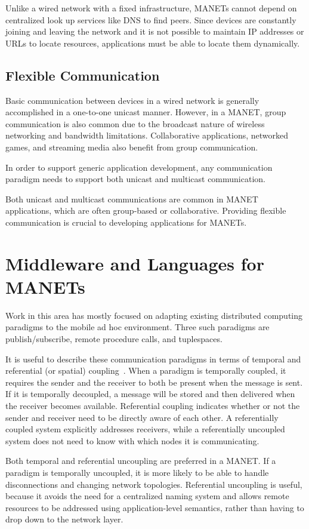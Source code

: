 Unlike a wired network with a fixed infrastructure, MANETs cannot depend on centralized look up services like DNS to find peers. Since devices are constantly joining and leaving the network and it is not possible to maintain IP addresses or URLs to locate resources, applications must be able to locate them dynamically.

\subsection{Flexible Communication}

Basic communication between devices in a wired network is generally accomplished in a one-to-one unicast manner. However, in a MANET, group communication is also common due to the broadcast nature of wireless networking and bandwidth limitations. Collaborative applications, networked games, and streaming media also benefit from group communication.

In order to support generic application development, any communication paradigm needs to support both unicast and multicast communication.

 Both unicast and multicast communications are common in MANET applications, which are often group-based or collaborative. Providing flexible communication is crucial to developing applications for MANETs.

\section{Middleware and Languages for MANETs}

Work in this area has mostly focused on adapting existing distributed computing paradigms to the mobile ad hoc environment. Three such paradigms are publish/subscribe, remote procedure calls, and tuplespaces.

It is useful to describe these communication paradigms in terms of temporal and referential (or spatial) coupling~\cite{distbook}. When a paradigm is temporally coupled, it requires the sender and the receiver to both be present when the message is sent. If it is temporally decoupled, a message will be stored and then delivered when the receiver becomes available. Referential coupling indicates whether or not the sender and receiver need to be directly aware of each other. A referentially coupled system explicitly addresses receivers, while a referentially uncoupled system does not need to know with which nodes it is communicating. 

Both temporal and referential uncoupling are preferred in a MANET. If a paradigm is temporally uncoupled, it is more likely to be able to handle disconnections and changing network topologies. Referential uncoupling is useful, because it avoids the need for a centralized naming system and allows remote resources to be addressed using application-level semantics, rather than having to drop down to the network layer.

